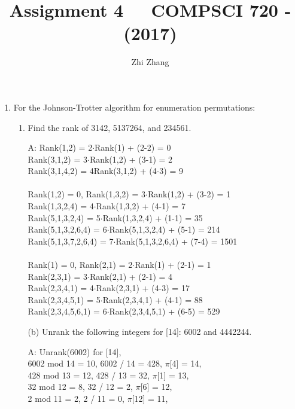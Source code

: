 \documentclass[11pt]{article} %
\title{Assignment 4 $\ \ \ \ $ COMPSCI 720 - (2017)}
\author{Zhi Zhang}
\date{} %
\begin{document}
\maketitle

\begin{enumerate}
	\item For the Johnson-Trotter algorithm for enumeration permutations:
	\begin{enumerate}
		\item Find the rank of 3142, 5137264, and 234561.
		\item[A:] \nobreak
				Rank(1,2) = 2$\cdot$Rank(1) + (2-2) = 0 \\
				Rank(3,1,2) = 3$\cdot$Rank(1,2) + (3-1) = 2 \\
				Rank(3,1,4,2) = 4Rank(3,1,2) + (4-3) = 9 \\
				\\
				Rank(1,2) = 0, Rank(1,3,2) = 3$\cdot$Rank(1,2) + (3-2) = 1 \\
				Rank(1,3,2,4) = 4$\cdot$Rank(1,3,2) + (4-1) = 7 \\
				Rank(5,1,3,2,4) = 5$\cdot$Rank(1,3,2,4) + (1-1) = 35 \\
				Rank(5,1,3,2,6,4) = 6$\cdot$Rank(5,1,3,2,4) + (5-1) = 214 \\
				Rank(5,1,3,7,2,6,4) = 7$\cdot$Rank(5,1,3,2,6,4) + (7-4) = 1501 \\
				\\
				Rank(1) = 0, Rank(2,1) = 2$\cdot$Rank(1) + (2-1) = 1 \\
				Rank(2,3,1) = 3$\cdot$Rank(2,1) + (2-1) = 4 \\
				Rank(2,3,4,1) = 4$\cdot$Rank(2,3,1) + (4-3) = 17 \\
				Rank(2,3,4,5,1) = 5$\cdot$Rank(2,3,4,1) + (4-1) = 88 \\
				Rank(2,3,4,5,6,1) = 6$\cdot$Rank(2,3,4,5,1) + (6-5) = 529 \\
		\item[(b)] Unrank the following integers for [14]: 6002 and 4442244. \\
		\item[A:] \nobreak
				Unrank(6002) for [14], \\
				6002 mod 14 = 10, 6002 / 14 = 428, $\pi$[4] = 14,\\
				428 mod 13 = 12, 428 / 13 = 32, $\pi$[1] = 13,\\
				32 mod 12 = 8, 32 / 12 = 2, $\pi$[6] = 12,\\
				2 mod 11 = 2, 2 / 11 = 0, $\pi$[12] = 11,\\

\end{enumerate}
\end{enumerate}
\end{document}
